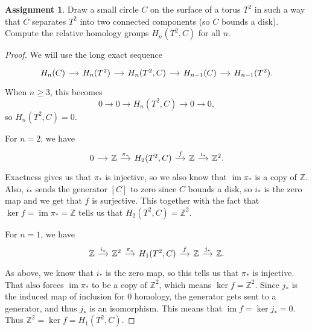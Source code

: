 \documentclass[12pt]{article}
\DeclareMathOperator{\im}{im}
\theoremstyle{definition}
\newtheorem{ex}{Assignment}
\begin{document}
\begin{ex}
	Draw a small circle $C$ on the surface of a torus $T^2$ in such a way that $C$ separates $T^2$ into two connected components (so $C$ bounds a disk).
	Compute the relative homology groups $H_n(T^2, C)$ for all $n$.
\end{ex}
\begin{proof}
	We will use the long exact sequence \begin{equation*}
		\begin{tikzcd}[column sep=small]
			H_n(C) \arrow[r, ""] & H_n(T^2) \arrow[r, ""] & H_n(T^2, C) \arrow[r, ""] & H_{n-1}(C) \arrow[r, ""] & H_{n-1}(T^2).
		\end{tikzcd}
	\end{equation*}
	When $n \geq 3$, this becomes \begin{equation*}
		0 \to 0 \to H_n(T^2, C) \to 0 \to 0,
	\end{equation*}
	so $H_n(T^2, C) = 0$.

	For $n = 2$, we have \begin{equation*}
		\begin{tikzcd}[column sep=small]
			0 \arrow[r, ""] & \mathbb{Z} \arrow[r, "\pi_*"] & H_2(T^2, C) \arrow[r, "f"] & \mathbb{Z} \arrow[r, "i_*"] & \mathbb{Z}^2.
		\end{tikzcd}
	\end{equation*}
	Exactness gives us that $\pi_*$ is injective, so we also know that $\im \pi_*$ is a copy of $\mathbb{Z}$.
	Also, $i_*$ sends the generator $[C]$ to zero since $C$ bounds a disk, so $i_*$ is the zero map and we get that $f$ is surjective.
	This together with the fact that $\ker f = \im \pi_* = \mathbb{Z}$ tells us that $H_2(T^2, C) = \mathbb{Z}^2$.

	For $n = 1$, we have \begin{equation*}
		\begin{tikzcd}[column sep=small]
			\mathbb{Z} \arrow[r, "i_*"] & \mathbb{Z}^2 \arrow[r, "\pi_*"] & H_1(T^2, C) \arrow[r, "f"] & \mathbb{Z} \arrow[r, "j_*"] & \mathbb{Z}.
		\end{tikzcd}
	\end{equation*}
	As above, we know that $i_*$ is the zero map, so this tells us that $\pi_*$ is injective.
	That also forces $\im\pi_*$ to be a copy of $\mathbb{Z}^2$, which means $\ker f = \mathbb{Z}^2$.
	Since $j_*$ is the induced map of inclusion for 0 homology, the generator gets sent to a generator, and thus $j_*$ is an isomorphism.
	This means that $\im f = \ker j_* = 0$.
	Thus $\mathbb{Z}^2 = \ker f = H_1(T^2, C)$.


\end{proof}
\end{document}
